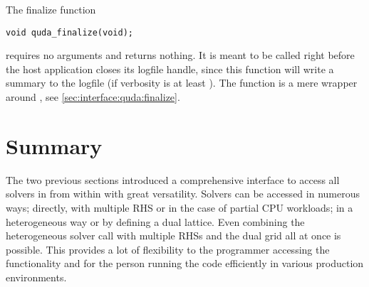 
The finalize function
\begin{verbatim}
void quda_finalize(void);
\end{verbatim}
requires no arguments and returns nothing.
It is meant to be called right before the host application closes its logfile handle, since this function will write a summary to the logfile (if verbosity is at least ).
The function is a mere wrapper around , see \cref{sec:interface:quda:finalize}.

\section{Summary}
\label{sec:interface:summary}

The two previous sections introduced a comprehensive interface to access all solvers in \quda from within \openqxd with great versatility.
Solvers can be accessed in numerous ways; directly, with multiple RHS or in the case of partial CPU workloads; in a heterogeneous way or by defining a dual lattice.
Even combining the heterogeneous solver call with multiple RHSs and the dual grid all at once is possible.
This provides a lot of flexibility to the programmer accessing the functionality and for the person running the code efficiently in various production environments.





